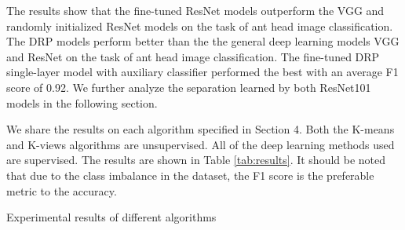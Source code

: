 \documentclass{aci}
\numberwithin{equation}{section}
\begin{document}
The results show that the fine-tuned ResNet models outperform the VGG and
randomly initialized ResNet models on the task of ant head image classification.
The DRP models perform better than the the general deep learning models VGG and
ResNet on the task of ant head image classification. The fine-tuned DRP
single-layer model with auxiliary classifier performed the best with an average
F1 score of 0.92. We further analyze the separation learned by both ResNet101
models in the following section.


We share the results on each algorithm specified in Section 4. Both the K-means
and K-views algorithms are unsupervised. All of the deep learning methods used
are supervised. The results are shown in Table \ref{tab:results}. It should be
noted that due to the class imbalance in the dataset, the F1 score is the
preferable metric to the accuracy.

\begin{table}[h]
    \centering
    \caption{Experimental results of different algorithms}
    \small
    
    \label{tab:results}
\end{table}






\end{document}
